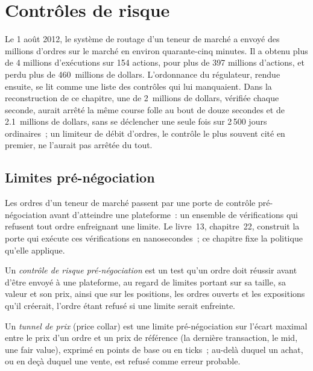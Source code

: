 \chapter{Contrôles de risque}\label{ch:hf:risk-controls}

Le 1 août 2012, le système de routage d'un teneur de marché a envoyé des millions d'ordres sur le marché en environ quarante-cinq minutes. Il a obtenu plus de 4
millions d'exécutions sur 154 actions, pour plus de 397 millions d'actions, et perdu plus de 460~millions de dollars. L'ordonnance du régulateur, rendue ensuite, se lit comme une
liste des contrôles qui lui manquaient. Dans la reconstruction de ce chapitre, une  de 2~millions de dollars, vérifiée chaque seconde, aurait arrêté
la même course folle au bout de douze secondes et de 2.1~millions de dollars, sans se déclencher une seule fois sur 2\,500 jours ordinaires~; un limiteur de débit d'ordres, le contrôle le plus
souvent cité en premier, ne l'aurait pas arrêtée du tout.

\section{Limites pré-négociation}

Les ordres d'un teneur de marché passent par une porte de contrôle pré-négociation avant d'atteindre une plateforme~: un ensemble de vérifications qui refusent tout ordre enfreignant une limite. Le
livre~13, chapitre~22, construit la porte qui exécute ces vérifications en nanosecondes~; ce chapitre fixe la politique qu'elle applique.

\begin{definition}\label{def:hf:risk-controls:pretrade}
Un \emph{contrôle de risque pré-négociation} est un test qu'un ordre doit réussir avant d'être envoyé à une plateforme, au regard de limites portant sur sa taille,
sa valeur et son prix, ainsi que sur les positions, les ordres ouverts et les expositions qu'il créerait, l'ordre étant refusé si une limite serait enfreinte.
\end{definition}

\begin{definition}\label{def:hf:risk-controls:collar}
Un \emph{tunnel de prix} (price collar) est une limite pré-négociation sur l'écart maximal entre le prix d'un ordre et un prix de référence (la dernière transaction, le mid, une
fair value), exprimé en points de base ou en ticks~; au-delà duquel un achat, ou en deçà duquel une vente, est refusé comme erreur probable.
\end{definition}

